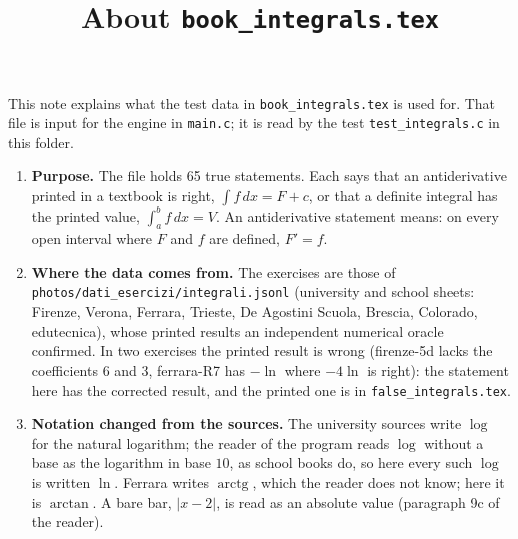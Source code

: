 \documentclass[11pt,a4paper]{article}
\title{About \texttt{book\_integrals.tex}}
\author{}
\date{}
\begin{document}
\maketitle
This note explains what the test data in \texttt{book\_integrals.tex} is used for. That file is input for the engine in \texttt{main.c}; it is read by the test \texttt{test\_integrals.c} in this folder.

\begin{enumerate}
\item \textbf{Purpose.} The file holds 65 true statements. Each says that an antiderivative printed in a textbook is right, $\int f \, dx = F + c$, or that a definite integral has the printed value, $\int_{a}^{b} f \, dx = V$. An antiderivative statement means: on every open interval where $F$ and $f$ are defined, $F' = f$.

\item \textbf{Where the data comes from.} The exercises are those of \texttt{photos/dati\_esercizi/integrali.jsonl} (university and school sheets: Firenze, Verona, Ferrara, Trieste, De Agostini Scuola, Brescia, Colorado, edutecnica), whose printed results an independent numerical oracle confirmed. In two exercises the printed result is wrong (firenze-5d lacks the coefficients $6$ and $3$, ferrara-R7 has $-\ln$ where $-4\ln$ is right): the statement here has the corrected result, and the printed one is in \texttt{false\_integrals.tex}.

\item \textbf{Notation changed from the sources.} The university sources write $\log$ for the natural logarithm; the reader of the program reads $\log$ without a base as the logarithm in base $10$, as school books do, so here every such $\log$ is written $\ln$. Ferrara writes $\operatorname{arctg}$, which the reader does not know; here it is $\arctan$. A bare bar, $|x - 2|$, is read as an absolute value (paragraph 9c of the reader).


\end{enumerate}
\end{document}
